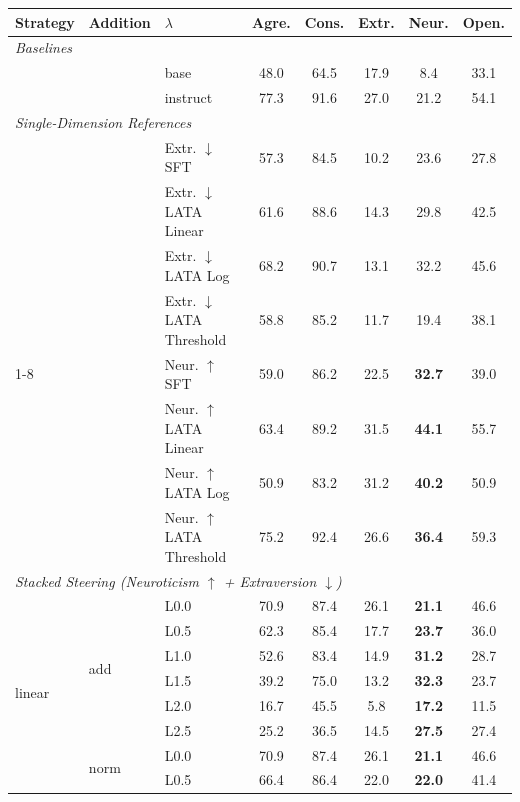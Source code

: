 \begin{table}[htbp]
\centering
\footnotesize
\setlength{\tabcolsep}{3.5pt}
\begin{tabular}{lllccccc}
\toprule
Strategy & Addition & $\lambda$ & Agre. & Cons. & Extr. & Neur. & Open. \\
\midrule
\multicolumn{8}{l}{\textit{Baselines}} \\
\midrule
 & & base & 48.0 & 64.5 & 17.9 & 8.4 & 33.1 \\
 & & instruct & 77.3 & 91.6 & 27.0 & 21.2 & 54.1 \\
\midrule
\multicolumn{8}{l}{\textit{Single-Dimension References}} \\
\midrule
 & & Extr. $\downarrow$ SFT & 57.3 & 84.5 & 10.2 & 23.6 & 27.8 \\
 & & Extr. $\downarrow$ LATA Linear & 61.6 & 88.6 & 14.3 & 29.8 & 42.5 \\
 & & Extr. $\downarrow$ LATA Log & 68.2 & 90.7 & 13.1 & 32.2 & 45.6 \\
 & & Extr. $\downarrow$ LATA Threshold & 58.8 & 85.2 & 11.7 & 19.4 & 38.1 \\
\cmidrule{1-8}
 & & Neur. $\uparrow$ SFT & 59.0 & 86.2 & 22.5 & \textbf{32.7} & 39.0 \\
 & & Neur. $\uparrow$ LATA Linear & 63.4 & 89.2 & 31.5 & \textbf{44.1} & 55.7 \\
 & & Neur. $\uparrow$ LATA Log & 50.9 & 83.2 & 31.2 & \textbf{40.2} & 50.9 \\
 & & Neur. $\uparrow$ LATA Threshold & 75.2 & 92.4 & 26.6 & \textbf{36.4} & 59.3 \\
\midrule
\multicolumn{8}{l}{\textit{Stacked Steering (Neuroticism $\uparrow$ + Extraversion $\downarrow$)}} \\
\midrule
\multirow{12}{*}{linear} & \multirow{6}{*}{add} & L0.0 & 70.9 & 87.4 & 26.1 & \textbf{21.1} & 46.6 \\
 &  & L0.5 & 62.3 & 85.4 & 17.7 & \textbf{23.7} & 36.0 \\
 &  & L1.0 & 52.6 & 83.4 & 14.9 & \textbf{31.2} & 28.7 \\
 &  & L1.5 & 39.2 & 75.0 & 13.2 & \textbf{32.3} & 23.7 \\
 &  & L2.0 & 16.7 & 45.5 & 5.8 & \textbf{17.2} & 11.5 \\
 &  & L2.5 & 25.2 & 36.5 & 14.5 & \textbf{27.5} & 27.4 \\
\cmidrule{2-8}
 & \multirow{6}{*}{norm} & L0.0 & 70.9 & 87.4 & 26.1 & \textbf{21.1} & 46.6 \\
 &  & L0.5 & 66.4 & 86.4 & 22.0 & \textbf{22.0} & 41.4 \\

\end{tabular}
\end{table}
